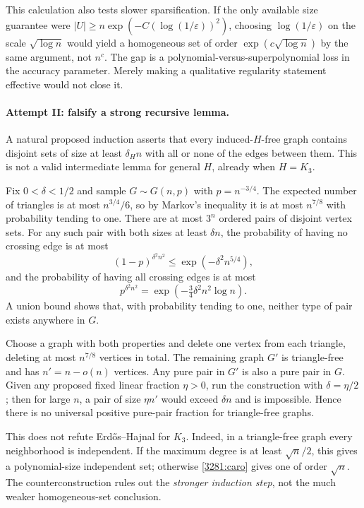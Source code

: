 \documentclass[11pt,a4paper]{article}
\numberwithin{equation}{section}
\begin{document}
This calculation also tests slower sparsification.  If the only
available size guarantee were
$|U|\geq n\exp(-C(\log(1/\varepsilon))^2)$, choosing
$\log(1/\varepsilon)$ on the scale $\sqrt{\log n}$ would yield a
homogeneous set of order $\exp(c\sqrt{\log n})$ by the same argument,
not $n^c$.  The gap is a polynomial-versus-superpolynomial loss in the
accuracy parameter.  Merely making a qualitative regularity statement
effective would not close it.

\paragraph{Attempt II: falsify a strong recursive lemma.}
A natural proposed induction asserts that every induced-$H$-free graph
contains disjoint sets of size at least $\delta_H n$ with all or none
of the edges between them.  This is not a valid intermediate lemma
for general $H$, already when $H=K_3$.

Fix $0<\delta<1/2$ and sample $G\sim G(n,p)$ with $p=n^{-3/4}$.
The expected number of triangles is at most $n^{3/4}/6$, so by Markov's
inequality it is at most $n^{7/8}$ with probability tending to one.
There are at most $3^n$ ordered pairs of disjoint vertex sets.  For any
such pair with both sizes at least $\delta n$, the probability of
having no crossing edge is at most
\[
 (1-p)^{\delta^2n^2}\leq\exp(-\delta^2n^{5/4}),
\]
and the probability of having all crossing edges is at most
\[
 p^{\delta^2n^2}=\exp(-\tfrac34\delta^2n^2\log n).
\]
A union bound shows that, with probability tending to one, neither
type of pair exists anywhere in $G$.

Choose a graph with both properties and delete one vertex from each
triangle, deleting at most $n^{7/8}$ vertices in total.  The remaining
graph $G'$ is triangle-free and has $n'=n-o(n)$ vertices.  Any pure
pair in $G'$ is also a pure pair in $G$.  Given any proposed fixed
linear fraction $\eta>0$, run the construction with $\delta=\eta/2$;
then for large $n$, a pair of size $\eta n'$ would exceed $\delta n$
and is impossible.  Hence there is no universal positive pure-pair
fraction for triangle-free graphs.

This does not refute Erd\H{o}s--Hajnal for $K_3$.  Indeed, in a
triangle-free graph every neighborhood is independent.  If the maximum
degree is at least $\sqrt n/2$, this gives a polynomial-size independent
set; otherwise \eqref{3281:caro} gives one of order $\sqrt n$.
The counterconstruction rules out the \emph{stronger induction step},
not the much weaker homogeneous-set conclusion.
\end{document}
